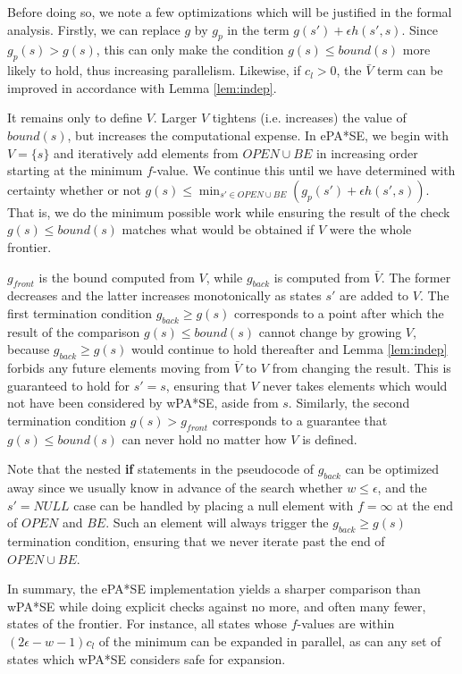 \documentclass[letterpaper]{article}
\begin{document}
Before doing so, we note a few optimizations which will be justified in the formal analysis. Firstly, we can replace $g$ by $g_p$ in the term $g(s') + \epsilon h(s',s)$. Since $g_p(s) > g(s)$, this can only make the condition $g(s) \le bound(s)$ more likely to hold, thus increasing parallelism. Likewise, if $c_l > 0$, the $\bar V$ term can be improved in accordance with Lemma \ref{lem:indep}.

It remains only to define $V$. Larger $V$ tightens (i.e. increases) the value of $bound(s)$, but increases the computational expense. In ePA*SE, we begin with $V = \{s\}$ and iteratively add elements from $OPEN\cup BE$ in increasing order starting at the minimum $f$-value. We continue this until we have determined with certainty whether or not $g(s) \le \min_{s'\in OPEN\cup BE}\left(g_p(s') + \epsilon h(s',s)\right)$. That is, we do the minimum possible work while ensuring the result of the check $g(s) \le bound(s)$ matches what would be obtained if $V$ were the whole frontier.

$g_{front}$ is the bound computed from $V$, while $g_{back}$ is computed from $\bar V$. The former decreases and the latter increases monotonically as states $s'$ are added to $V$. The first termination condition $g_{back} \ge g(s)$ corresponds to a point after which the result of the comparison $g(s) \le bound(s)$ cannot change by growing $V$, because $g_{back} \ge g(s)$ would continue to hold thereafter and Lemma \ref{lem:indep} forbids any future elements moving from $\bar V$ to $V$ from changing the result. This is guaranteed to hold for $s' = s$, ensuring that $V$ never takes elements which would not have been considered by wPA*SE, aside from $s$. Similarly, the second termination condition $g(s) > g_{front}$ corresponds to a guarantee that $g(s) \le bound(s)$ can never hold no matter how $V$ is defined.

Note that the nested \textbf{if} statements in the pseudocode of $g_{back}$ can be optimized away since we usually know in advance of the search whether $w \le \epsilon$, and the $s' = NULL$ case can be handled by placing a null element with $f = \infty$ at the end of $OPEN$ and $BE$. Such an element will always trigger the $g_{back} \ge g(s)$ termination condition, ensuring that we never iterate past the end of $OPEN\cup BE$.

In summary, the ePA*SE implementation yields a sharper comparison than wPA*SE while doing explicit checks against no more, and often many fewer, states of the frontier. For instance, all states whose $f$-values are within $(2\epsilon-w-1)c_l$ of the minimum can be expanded in parallel, as can any set of states which wPA*SE considers safe for expansion.
\end{document}
